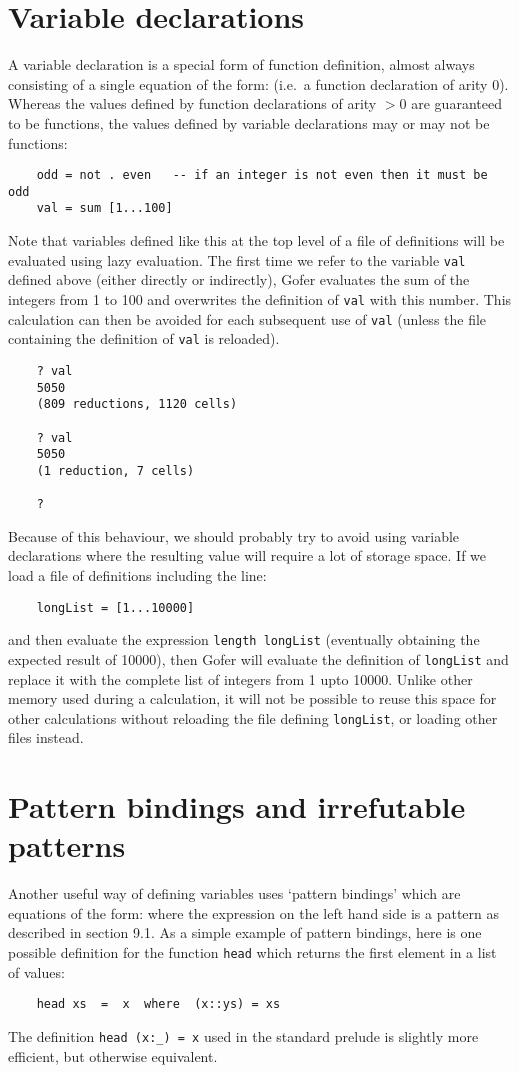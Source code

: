 \section{Variable declarations}
A variable declaration  is  a  special  form  of  function  definition,
almost always consisting of a single equation of the form:
\BQ
      \TT{=} 
\EQ
(i.e.\ a function declaration of arity 0).  Whereas the  values  defined
by function declarations of arity $>0$ are guaranteed to be functions, the
values defined by variable declarations may or may not be functions:
\begin{verbatim}
    odd = not . even   -- if an integer is not even then it must be odd
    val = sum [1...100]
\end{verbatim}
Note that variables defined like this at the top level  of  a  file  of
definitions will be evaluated using lazy evaluation.  The first time we
refer  to  the  variable  \verb"val"  defined  above  (either  directly   or
indirectly), Gofer evaluates the sum of the integers from 1 to 100  and
overwrites the definition of \verb"val" with this number.  This  calculation
can then be avoided for each subsequent use of \verb"val" (unless  the  file
containing the definition of \verb"val" is reloaded).
\begin{verbatim}
    ? val
    5050
    (809 reductions, 1120 cells)

    ? val
    5050
    (1 reduction, 7 cells)

    ?
\end{verbatim}
Because of this behaviour, we should probably try to avoid using  variable
declarations where the resulting value will require a  lot  of  storage
space.  If we load a file of definitions including the line:
\begin{verbatim}
    longList = [1...10000]
\end{verbatim}
and  then  evaluate  the  expression  \verb"length longList"   (eventually
obtaining the expected result of 10000), then Gofer will  evaluate  the
definition of \verb"longList" and replace  it  with  the  complete  list  of
integers from  1  upto  10000.   Unlike  other  memory  used  during  a
calculation, it will not be possible to  reuse  this  space  for  other
calculations without reloading the file defining \verb"longList", or loading
other files instead.


\section{Pattern bindings and irrefutable patterns}
Another useful way of defining variables uses `pattern bindings'  which
are equations of the form:
\BQ
       \TT{=} 
\EQ
where the expression on the left hand side is a pattern as described in
section 9.1.  As a simple example of  pattern  bindings,  here  is  one
possible definition for the function \verb"head"  which  returns  the  first
element in a list of values:
\begin{verbatim}
    head xs  =  x  where  (x::ys) = xs
\end{verbatim}
The definition \verb"head (x:_) = x"  used  in  the  standard  prelude  is
slightly more efficient, but otherwise equivalent.

